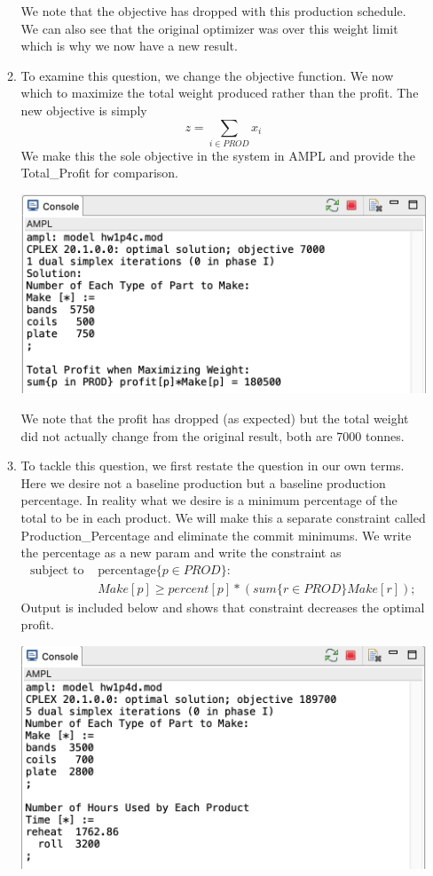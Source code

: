 \documentclass[11pt]{article}
\begin{document}
\begin{enumerate}
\begin{enumerate}
We note that the objective has dropped with this production schedule.  We can also see that the original optimizer was over this weight limit which is why we now have a new result.

\item To examine this question, we change the objective function.  We now which to maximize the total weight produced rather than the profit.  The new objective is simply
\[
z = \sum_{i\in PROD} x_i
\]
We make this the sole objective in the system in AMPL and provide the Total\_Profit for comparison.

\includegraphics[width = .9\textwidth]{outputp4c.png}

We note that the profit has dropped (as expected) but the total weight did not actually change from the original result, both are 7000 tonnes.

\item To tackle this question, we first restate the question in our own terms.  Here we desire not a baseline production but a baseline production percentage.  In reality what we desire is a minimum percentage of the total to be in each product.  We will make this a separate constraint called Production\_Percentage and eliminate the commit minimums.  We write the percentage as a new param and write the constraint as 
\begin{eqnarray*}
\text{subject to }&\text{percentage} \{p \in PROD\}:\\ &Make[p] \geq percent[p]*\left(sum \{r \in PROD\} Make[r]\right);
\end{eqnarray*}
Output is included below and shows that constraint decreases the optimal profit.

\includegraphics[width = .9\textwidth]{outputp4d.png}


\end{enumerate}
\end{enumerate}
\end{document}
